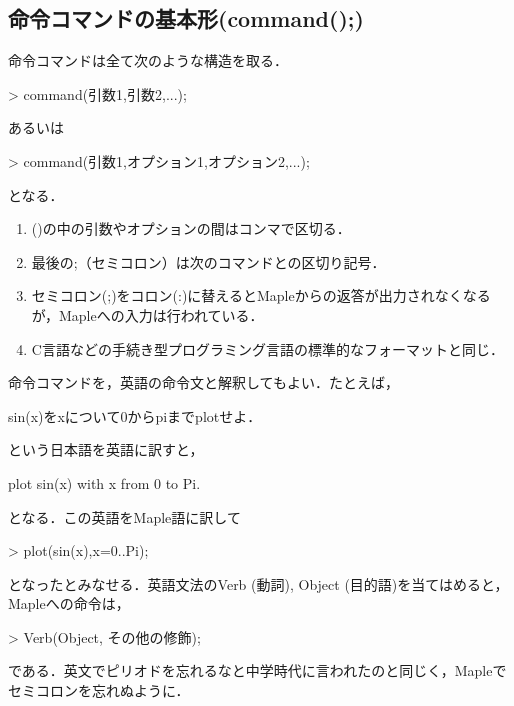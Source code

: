 \subsection{命令コマンドの基本形(command();)}
命令コマンドは全て次のような構造を取る．
\begin{MapleInput}
> command(引数1,引数2,...);
\end{MapleInput}
あるいは
\begin{MapleInput}
> command(引数1,オプション1,オプション2,...);
\end{MapleInput}
となる．

\begin{enumerate}
\item ()の中の引数やオプションの間はコンマで区切る．
\item 最後の;（セミコロン）は次のコマンドとの区切り記号．
\item セミコロン(;)をコロン(:)に替えるとMapleからの返答が出力されなくなるが，Mapleへの入力は行われている．
\item C言語などの手続き型プログラミング言語の標準的なフォーマットと同じ．
\end{enumerate}

命令コマンドを，英語の命令文と解釈してもよい．たとえば，
\begin{MapleError}
sin(x)をxについて0からpiまでplotせよ．
\end{MapleError}
という日本語を英語に訳すと，
\begin{MapleError}
plot sin(x) with x from 0 to Pi.
\end{MapleError}
となる．この英語をMaple語に訳して
\begin{MapleInput}
> plot(sin(x),x=0..Pi);
\end{MapleInput}
となったとみなせる．英語文法のVerb (動詞), Object (目的語)を当てはめると，Mapleへの命令は，
\begin{MapleInput}
> Verb(Object, その他の修飾);
\end{MapleInput}
である．英文でピリオドを忘れるなと中学時代に言われたのと同じく，Mapleでセミコロンを忘れぬように．


